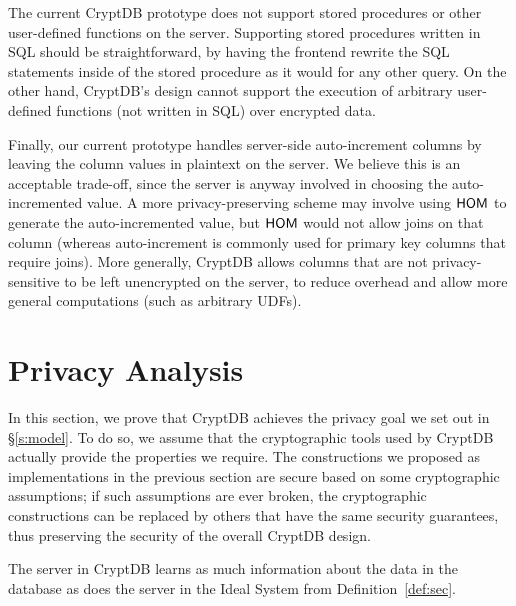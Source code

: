 The current CryptDB prototype does not support stored procedures or
other user-defined functions on the server.  Supporting stored
procedures written in SQL should be straightforward, by having the
frontend rewrite the SQL statements inside of the stored procedure
as it would for any other query.  On the other hand, CryptDB's
design cannot support the execution of arbitrary user-defined
functions (not written in SQL) over encrypted data.

Finally, our current prototype handles server-side auto-increment
columns by leaving the column values in plaintext on the server.
We believe this is an acceptable trade-off, since the server is
anyway involved in choosing the auto-incremented value.  A more
privacy-preserving scheme may involve using $\mathsf{HOM}$ to generate
the auto-incremented value, but $\mathsf{HOM}$ would not allow joins on
that column (whereas auto-increment is commonly used for primary
key columns that require joins).  More generally, CryptDB allows
columns that are not privacy-sensitive to be left unencrypted
on the server, to reduce overhead and allow more general
computations (such as arbitrary UDFs).


% 



\section{Privacy Analysis}
\label{s:analysis}

In this section, we prove that CryptDB achieves the privacy goal we set
out in \S\ref{s:model}.  To do so, we assume that the cryptographic tools
used by CryptDB actually provide the properties we require.  The constructions
we proposed as implementations in the previous section are secure based on
some cryptographic assumptions; if such assumptions are ever broken, the
cryptographic constructions can be replaced by others that have the same
security guarantees, thus preserving the security of the overall CryptDB
design.

\begin{theorem}
The server in CryptDB learns as much
information about the data in the database as does the server in the Ideal
System from Definition~\ref{def:sec}.
\end{theorem}

